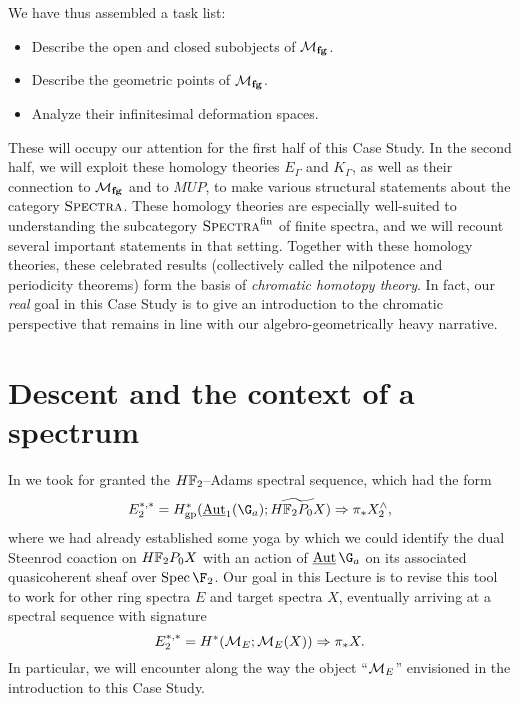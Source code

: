 We have thus assembled a task list:
\begin{itemize}
\item Describe the open and closed subobjects of \(\mathcal{M}_{\mathbf{fg}}\).
\item Describe the geometric points of \(\mathcal{M}_{\mathbf{fg}}\).
\item Analyze their infinitesimal deformation spaces.
\end{itemize}
These will occupy our attention for the first half of this Case Study.  In the second half, we will exploit these homology theories \(E_\Gamma\) and \(K_\Gamma\), as well as their connection to \(\mathcal{M}_{\mathbf{fg}}\) and to \(MUP\), to make various structural statements about the category \(\normalfont\textsc{Spectra}\).  These homology theories are especially well-suited to understanding the subcategory \(\normalfont\textsc{Spectra}^{\mathrm{fin}}\) of finite spectra, and we will recount several important statements in that setting.  Together with these homology theories, these celebrated results (collectively called the nilpotence and periodicity theorems) form the basis of \textit{chromatic homotopy theory}.  In fact, our \emph{real} goal in this Case Study is to give an introduction to the chromatic perspective that remains in line with our algebro-geometrically heavy narrative.








\section{Descent and the context of a spectrum}\label{StableContextLecture}

In  we took for granted the \(\HFtwo\)--Adams spectral sequence, which had the form \[E_2^{*, *} = H^*_{\mathrm{gp}}(\InternalAut_1(\G_a); \widetilde{\HFtwo P_0 X}) \Rightarrow \pi_* X^\wedge_2,\] where we had already established some yoga by which we could identify the dual Steenrod coaction on \(\HFtwo P_0 X\) with an action of \(\InternalAut{\G_a}\) on its associated quasicoherent sheaf over \(\Spec \F_2\).  Our goal in this Lecture is to revise this tool to work for other ring spectra \(E\) and target spectra \(X\), eventually arriving at a spectral sequence with signature \[E_2^{*, *} = H^*(\mathcal{M}_{E}; \mathcal{M}_{E}(X)) \Rightarrow \pi_* X.\]  In particular, we will encounter along the way the object ``\(\mathcal{M}_{E}\)'' envisioned in the introduction to this Case Study.

